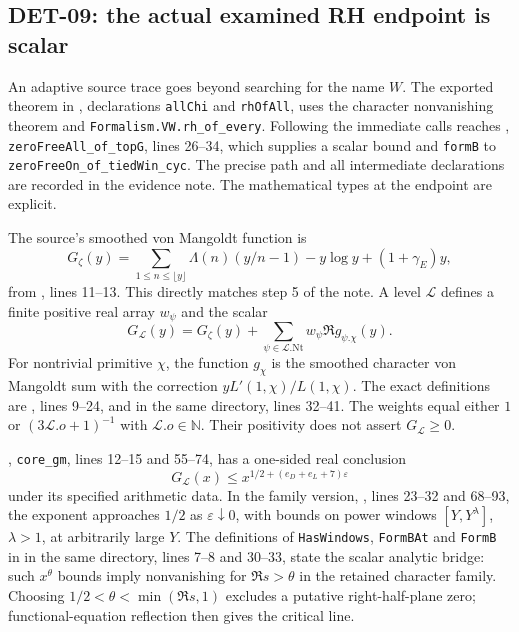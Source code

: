 \subsection{DET-09: the actual examined RH endpoint is scalar}
An adaptive source trace goes beyond searching for the name $W$. The exported theorem in , declarations \texttt{allChi} and \texttt{rhOfAll}, uses the character nonvanishing theorem and \texttt{Formalism.VW.rh\_of\_every}. Following the immediate calls reaches , \texttt{zeroFreeAll\_of\_topG}, lines 26--34, which supplies a scalar bound and \texttt{formB} to \texttt{zeroFreeOn\_of\_tiedWin\_cyc}. The precise path and all intermediate declarations are recorded in the evidence note. The mathematical types at the endpoint are explicit.

The source's smoothed von Mangoldt function is
\[
 G_\zeta(y)=\sum_{1\le n\le\lfloor y\rfloor}\Lambda(n)(y/n-1)
 -y\log y+(1+\gamma_E)y,
\]
from , lines 11--13. This directly matches step 5 of the note. A level $\mathcal L$ defines a finite positive real array $w_\psi$ and the scalar
\[
 G_{\mathcal L}(y)=G_\zeta(y)+\sum_{\psi\in\mathcal L.\mathrm{Nt}}w_\psi\Re g_{\psi.\chi}(y).
\]
For nontrivial primitive $\chi$, the function $g_\chi$ is the smoothed character von Mangoldt sum with the correction $yL'(1,\chi)/L(1,\chi)$. The exact definitions are , lines 9--24, and  in the same directory, lines 32--41. The weights equal either $1$ or $(3\mathcal L.o+1)^{-1}$ with $\mathcal L.o\in\mathbb N$. Their positivity does not assert $G_{\mathcal L}\ge0$.

, \texttt{core\_gm}, lines 12--15 and 55--74, has a one-sided real conclusion
\[
 G_{\mathcal L}(x)\le x^{1/2+(e_D+e_L+7)\varepsilon}
\]
under its specified arithmetic data. In the family version, , lines 23--32 and 68--93, the exponent approaches $1/2$ as $\varepsilon\downarrow0$, with bounds on power windows $[Y,Y^\lambda]$, $\lambda>1$, at arbitrarily large $Y$. The definitions of \texttt{HasWindows}, \texttt{FormBAt} and \texttt{FormB} in  in the same directory, lines 7--8 and 30--33, state the scalar analytic bridge: such $x^\theta$ bounds imply nonvanishing for $\Re s>\theta$ in the retained character family. Choosing $1/2<\theta<\min(\Re s,1)$ excludes a putative right-half-plane zero; functional-equation reflection then gives the critical line.

